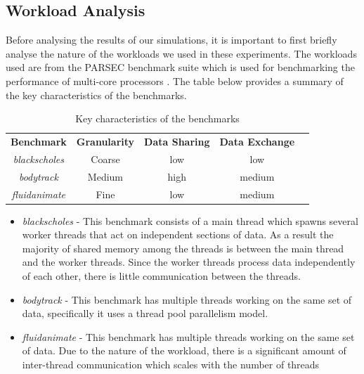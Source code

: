 \documentclass[nonacm,acmsmall,screen,11pt]{acmart}
\begin{document}
\subsection{Workload Analysis}
Before analysing the results of our simulations, it is important to first briefly analyse the nature of the workloads we used in these experiments. The workloads used are from the PARSEC benchmark suite which is used for benchmarking the performance of multi-core processors \cite{bienia2008parsec}. The table below provides a summary of the key characteristics of the benchmarks.
\begin{table}[htb!]
  \centering
  \caption{Key characteristics of the benchmarks \cite{bienia2008parsec}}
  \label{tab:benchmarks}
  \begin{tabular}{|c|c|c|c|l}
    \cline{1-4}
    \multicolumn{1}{|l|}{\textbf{Benchmark}} & \multicolumn{1}{l|}{\textbf{Granularity}} & \multicolumn{1}{l|}{\textbf{Data Sharing}} & \multicolumn{1}{l|}{\textbf{Data Exchange}} & \\ \cline{1-4}
    \textit{blackscholes}                    & Coarse                                    & low                                        & low                                         & \\ \cline{1-4}
    \textit{bodytrack}                       & Medium                                    & high                                       & medium                                      & \\ \cline{1-4}
    \textit{fluidanimate}                    & Fine                                      & low                                        & medium                                      & \\ \cline{1-4}
  \end{tabular}
\end{table}
\begin{itemize}
  \item \textit{blackscholes} - This benchmark consists of a main thread which spawns several worker threads that act on independent sections of data. As a result the majority of shared memory among the threads is between the main thread and the worker threads. Since the worker threads process data independently of each other, there is little communication between the threads.
  \item \textit{bodytrack} - This benchmark has multiple threads working on the same set of data, specifically it uses a thread pool parallelism model.
  \item \textit{fluidanimate} - This benchmark has multiple threads working on the same set of data. Due to the nature of the workload, there is a significant amount of inter-thread communication which scales with the number of threads \cite{bienia2008parsec}
\end{itemize}
\end{document}
